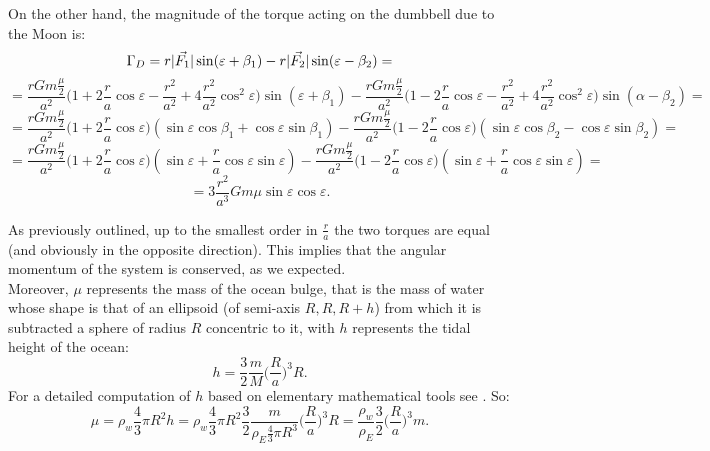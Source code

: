 \documentclass[11pt, oneside,reqno]{amsart}
\DeclarePairedDelimiter{\abs}{\lvert}{\rvert}
\begin{document}
On the other hand, the magnitude of the torque acting on the dumbbell due to the Moon is:
\begin{equation*}
	\Gamma_D = r \abs{\vec{F_1}} \sin(\varepsilon+\beta_1)-r \abs{\vec{F_2}} \sin(\varepsilon - \beta_2)=
\end{equation*}
\begin{equation*}
	= \frac{rGm\frac{\mu}{2}}{a^2} \biggr( 1 + 2\frac{r}{a} \cos \varepsilon -\frac{r^2}{a^2} + 4\frac{r^2}{a^2} \cos^2 \varepsilon  \biggl) \sin(\varepsilon+\beta_1) - \frac{rGm\frac{\mu}{2}}	{a^2} \biggr( 1 - 2\frac{r}{a} \cos \varepsilon - \frac{r^2}{a^2} + 4\frac{r^2}{a^2} \cos^2 			\varepsilon  \biggl) \sin(\alpha-\beta_2)=
\end{equation*}
\begin{equation*}
	= \frac{rGm\frac{\mu}{2}}{a^2} \biggr( 1 + 2\frac{r}{a} \cos \varepsilon  \biggl) (\sin\varepsilon\cos\beta_1+\cos\varepsilon\sin\beta_1) - \frac{rGm\frac{\mu}{2}}{a^2} \biggr( 1 	- 2\frac{r}{a} \cos \varepsilon \biggr) (\sin\varepsilon\cos\beta_2-\cos\varepsilon\sin\beta_2)=
\end{equation*}
\begin{equation*}
	= \frac{rGm\frac{\mu}{2}}{a^2} \biggr( 1 + 2\frac{r}{a} \cos \varepsilon  \biggl) (\sin\varepsilon+\frac{r}{a}\cos\varepsilon\sin\varepsilon) - \frac{rGm\frac{\mu}{2}}{a^2} \biggr( 1 - 2\frac{r}{a} \cos \varepsilon \biggr) (\sin\varepsilon+\frac{r}{a} \cos\varepsilon\sin\varepsilon)=
\end{equation*}
\begin{equation}
	\label{gammad}
	=3\frac{r^2}{a^3}Gm \mu \sin\varepsilon \cos\varepsilon.
\end{equation} 

As previously outlined, up to the smallest order in $\frac{r}{a}$ the two torques are equal (and obviously in the opposite direction). This implies that the angular momentum of the system is conserved, as we expected.\\

Moreover, $\mu$ represents the mass of the ocean bulge, that is the mass of water whose shape is that of an ellipsoid (of semi-axis $R, R, R+h$) from which it is subtracted a sphere of radius $R$ concentric to it, with $h$ represents the tidal height of the ocean:
\begin{equation}
	\label{h}
	h=\frac{3}{2}\frac{m}{M} \biggl( \frac{R}{a} \biggr)^3 R.
\end{equation}
For a detailed computation of $h$ based on elementary mathematical tools see \cite{3}. 
So:
\begin{equation}
	\label{mu}
	\mu=\rho_w \frac{4}{3}\pi R^2h=\rho_w \frac{4}{3}\pi R^2 \frac{3}{2}\frac{m}{\rho_E \frac{4}{3}		\pi R^3} \biggl( \frac{R}{a} \biggr)^3 R = \frac{\rho_w}{\rho_E} \frac{3}{2} \biggl( \frac{R}{a} 	\biggr)^3 m.
\end{equation}
\end{document}
